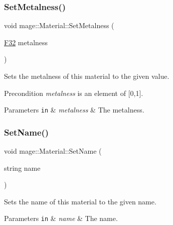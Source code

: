 \subsubsection{\texorpdfstring{Set\+Metalness()}{SetMetalness()}}
{\footnotesize\ttfamily void mage\+::\+Material\+::\+Set\+Metalness (\begin{DoxyParamCaption}\item[{\hyperlink{namespacemage_aa97e833b45f06d60a0a9c4fc22ae02c0}{F32}}]{metalness }\end{DoxyParamCaption})\hspace{0.3cm}{\ttfamily [noexcept]}}

Sets the metalness of this material to the given value.

\begin{DoxyPrecond}{Precondition}
{\itshape metalness} is an element of \mbox{[}0,1\mbox{]}. 
\end{DoxyPrecond}

\begin{DoxyParams}[1]{Parameters}
\mbox{\tt in}  & {\em metalness} & The metalness. \\
\hline
\end{DoxyParams}
\hypertarget{classmage_1_1_material_ad1083b74b6939f909eb471e0f45f63cb}{}\label{classmage_1_1_material_ad1083b74b6939f909eb471e0f45f63cb} 
\subsubsection{\texorpdfstring{Set\+Name()}{SetName()}}
{\footnotesize\ttfamily void mage\+::\+Material\+::\+Set\+Name (\begin{DoxyParamCaption}\item[{string}]{name }\end{DoxyParamCaption})\hspace{0.3cm}{\ttfamily [noexcept]}}

Sets the name of this material to the given name.


\begin{DoxyParams}[1]{Parameters}
\mbox{\tt in}  & {\em name} & The name. \\
\hline
\end{DoxyParams}
\hypertarget{classmage_1_1_material_a178b5b945137d7aab35db01a2e52ab31}{}\label{classmage_1_1_material_a178b5b945137d7aab35db01a2e52ab31} 
